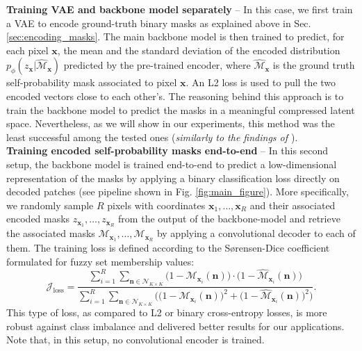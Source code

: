 \textbf{Training VAE and backbone model separately} -- In this case, we first train a VAE to encode ground-truth binary masks as explained above in Sec. \ref{sec:encoding_masks}. 
The main backbone model is then trained to predict, for each pixel $\mathbf{x}$, the mean and the standard deviation of the encoded distribution $p_{\phi}(z_{\mathbf{x}}|\hat{\mathcal{M}}_{\mathbf{x}})$ predicted by the pre-trained encoder, where $\hat{\mathcal{M}}_{\mathbf{x}}$ is the ground truth self-probability mask associated to pixel $\mathbf{x}$. An L2 loss is used to pull the two encoded vectors close to each other's. 
The reasoning behind this approach is to train the backbone model to predict the masks in a meaningful compressed latent space. 
Nevertheless, as we will show in our experiments, this method was the least successful among the tested ones (\emph{similarly to the findings of \cite{hirsch2020patchperpix}}).\\


\textbf{Training encoded self-probability masks end-to-end} --
In this second setup, the backbone model is trained end-to-end to predict a low-dimensional representation of the masks by applying a binary classification loss directly on decoded patches (see pipeline shown in Fig. \ref{fig:main_figure}). 
More specifically, we randomly sample $R$ pixels with coordinates $\mathbf{x}_1, \ldots, \mathbf{x}_R$ and their associated encoded masks $z_{\mathbf{x}_1}, \ldots, z_{\mathbf{x}_R}$ from the output of the backbone-model and retrieve the associated masks $\mathcal{M}_{\mathbf{x}_1}, \ldots, \mathcal{M}_{\mathbf{x}_R}$ by applying a convolutional decoder to each of them. 
The training loss is defined according to the S\o rensen-Dice coefficient \cite{dice1945measures,sorensen1948method} formulated for fuzzy set membership values:
\begin{equation}
\mathcal{J}_{\mathrm{loss}} = \frac{\sum_{i=1}^R \sum_{\mathbf{n} \in \mathcal{N}_{K\times K}} \big(1-\mathcal{M}_{\mathbf{x}_i}(\mathbf{n})\big)\cdot \big(1-\hat{\mathcal{M}}_{\mathbf{x}_i}(\mathbf{n})\big)}{\sum_{i=1}^R \sum_{\mathbf{n}\in \mathcal{N}_{K\times K}} \Big( \big(1-\mathcal{M}_{\mathbf{x}_i}(\mathbf{n})\big)^2 + \big(1-\hat{\mathcal{M}}_{\mathbf{x}_i}(\mathbf{n})\big)^2 \Big)}.
\end{equation} 
This type of loss, as compared to L2 or binary cross-entropy losses, is more robust against class imbalance and delivered better results for our applications.
Note that, in this setup, no convolutional encoder is trained.

